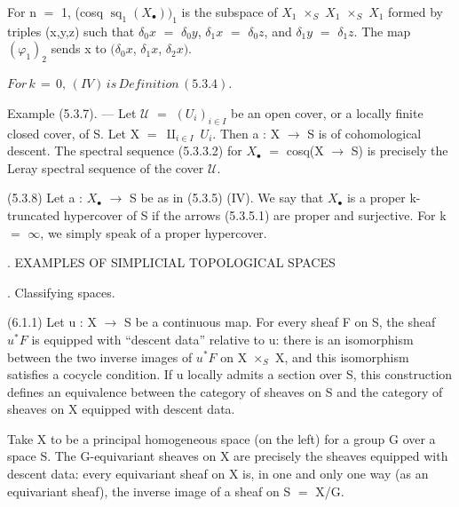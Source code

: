 \documentclass[11pt,twoside]{article}
\newcommand{\DFormula}[1]{%
  \par\smallskip\noindent\hspace*{0pt}\(\displaystyle #1\)\par\smallskip
}
\begin{document}
For n \(=\) 1, (cosq \(\operatorname{sq}_{1}(X_{\bullet }))_{1}\) is the subspace of \(X_{1}\) \(\times _{S}\) \(X_{1}\) \(\times _{S}\) \(X_{1}\) formed by triples (x,y,z) such that \(\delta _{0}x\) \(=\) \(\delta _{0}y\), \(\delta _{1}x\) \(=\) \(\delta _{0}z\), and \(\delta _{1}y\) \(=\) \(\delta _{1}z\). The map \((\varphi _{1})_{2}\) sends x to \((\delta _{0}x\), \(\delta _{1}x\), \(\delta _{2}x)\).\par
\par\medskip
\DFormula{For\,k\,=\,0,\,(IV)\,is\,Definition\,(5.3.4).}
\par\medskip
Example (5.3.7). — Let \(𝒰\) \(=\) \((U_{i})_{i\in I}\) be an open cover, or a locally finite closed cover, of S. Let X \(=\) \(⨿_{i\in I}\) \(U_{i}\). Then a : X \(\to \) S is of cohomological descent. The spectral sequence (5.3.3.2) for \(X_{\bullet }\) \(=\) cosq(X \(\to \) S) is precisely the Leray spectral sequence of the cover \(𝒰\).\par
\par\medskip
(5.3.8) Let a : \(X_{\bullet }\) \(\to \) S be as in (5.3.5) (IV). We say that \(X_{\bullet }\) is a proper k-truncated hypercover of S if the arrows (5.3.5.1) are proper and surjective. For k \(=\) \(\infty \), we simply speak of a proper hypercover.\par
\par{}. EXAMPLES OF SIMPLICIAL TOPOLOGICAL SPACES\par
\par{}. Classifying spaces.\par
\par\medskip
(6.1.1) Let u : X \(\to \) S be a continuous map. For every sheaf F on S, the sheaf \(u^{\ast }F\) is equipped with “descent data” relative to u: there is an isomorphism between the two inverse images of \(u^{\ast }F\) on X \(\times _{S}\) X, and this isomorphism satisfies a cocycle condition. If u locally admits a section over S, this construction defines an equivalence between the category of sheaves on S and the category of sheaves on X equipped with descent data.\par
\par\medskip
Take X to be a principal homogeneous space (on the left) for a group G over a space S. The G-equivariant sheaves on X are precisely the sheaves equipped with descent data: every equivariant sheaf on X is, in one and only one way (as an equivariant sheaf), the inverse image of a sheaf on S \(=\) X/G.\par
\par\medskip
\end{document}
